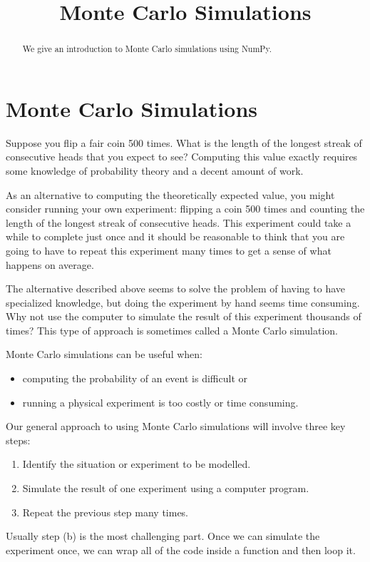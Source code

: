 \documentclass{ximera}
\title{Monte Carlo Simulations}
\begin{document}
  
\begin{abstract}  
We give an introduction to Monte Carlo simulations using NumPy.
\end{abstract}  
\maketitle

\section{Monte Carlo Simulations}

Suppose you flip a fair coin 500 times. What is the length of the longest streak of consecutive heads that you expect to see? Computing this value exactly requires some knowledge of probability theory and a decent amount of work. 

As an alternative to computing the theoretically expected value, you might consider running your own experiment: flipping a coin 500 times and counting the length of the longest streak of consecutive heads. This experiment could take a while to complete just once and it should be reasonable to think that you are going to have to repeat this experiment many times to get a sense of what happens on average.

The alternative described above seems to solve the problem of having to have specialized knowledge, but doing the experiment by hand seems time consuming. Why not use the computer to simulate the result of this experiment thousands of times? This type of approach is sometimes called a Monte Carlo simulation.

Monte Carlo simulations can be useful when:
	\begin{itemize}
		\item computing the probability of an event is difficult or
		\item running a physical experiment is too costly or time consuming.
	\end{itemize}
Our general approach to using Monte Carlo simulations will involve three key steps:
	\begin{enumerate}
		\item Identify the situation or experiment to be modelled.
		\item Simulate the result of one experiment using a computer program.
		\item Repeat the previous step many times.
	\end{enumerate}
Usually step (b) is the most challenging part. Once we can simulate the experiment once, we can wrap all of the code inside a function and then loop it.
\end{document}
